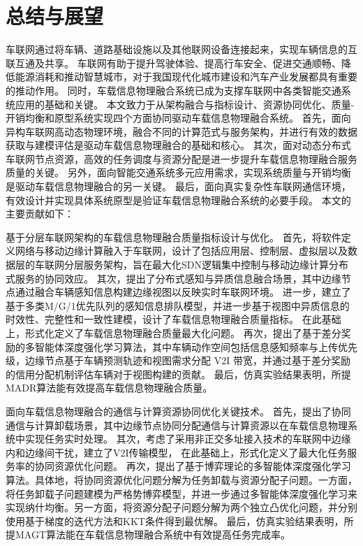 \chapter{总结与展望}\label{section 6}

车联网通过将车辆、道路基础设施以及其他联网设备连接起来，实现车辆信息的互联互通及共享。
车联网有助于提升驾驶体验、提高行车安全、促进交通顺畅、降低能源消耗和推动智慧城市，对于我国现代化城市建设和汽车产业发展都具有重要的推动作用。
同时，车载信息物理融合系统已成为支撑车联网中各类智能交通系统应用的基础和关键。
本文致力于从架构融合与指标设计、资源协同优化、质量-开销均衡和原型系统实现四个方面协同驱动车载信息物理融合系统。
首先，面向异构车联网高动态物理环境，融合不同的计算范式与服务架构，并进行有效的数据获取与建模评估是驱动车载信息物理融合的基础和核心。
其次，面对动态分布式车联网节点资源，高效的任务调度与资源分配是进一步提升车载信息物理融合服务质量的关键。
另外，面向智能交通系统多元应用需求，实现系统质量与开销均衡是驱动车载信息物理融合的另一关键。
最后，面向真实复杂性车联网通信环境，有效设计并实现具体系统原型是验证车载信息物理融合系统的必要手段。
本文的主要贡献如下：

 基于分层车联网架构的车载信息物理融合质量指标设计与优化。
首先，将软件定义网络与移动边缘计算融入于车联网，设计了包括应用层、控制层、虚拟层以及数据层的车联网分层服务架构，旨在最大化SDN逻辑集中控制与移动边缘计算分布式服务的协同效应。
其次，提出了分布式感知与异质信息融合场景，其中边缘节点通过融合车辆感知信息构建边缘视图以反映实时车联网环境。
进一步，建立了基于多类M/G/1优先队列的感知信息排队模型，并进一步基于视图中异质信息的时效性、完整性和一致性建模，设计了车载信息物理融合质量指标。
在此基础上，形式化定义了车载信息物理融合质量最大化问题。
再次，提出了基于差分奖励的多智能体深度强化学习算法，其中车辆动作空间包括信息感知频率与上传优先级，边缘节点基于车辆预测轨迹和视图需求分配 V2I 带宽，并通过基于差分奖励的信用分配机制评估车辆对于视图构建的贡献。
最后，仿真实验结果表明，所提MADR算法能有效提高车载信息物理融合质量。

 面向车载信息物理融合的通信与计算资源协同优化关键技术。
首先，提出了协同通信与计算卸载场景，其中边缘节点协同分配通信与计算资源以在车载信息物理系统中实现任务实时处理。
其次，考虑了采用非正交多址接入技术的车联网中边缘内和边缘间干扰，建立了V2I传输模型，
在此基础上，形式化定义了最大化任务服务率的协同资源优化问题。
再次，提出了基于博弈理论的多智能体深度强化学习算法。具体地，将协同资源优化问题分解为任务卸载与资源分配子问题。一方面，将任务卸载子问题建模为严格势博弈模型，并进一步通过多智能体深度强化学习来实现纳什均衡。另一方面，将资源分配子问题分解为两个独立凸优化问题，并分别使用基于梯度的迭代方法和KKT条件得到最优解。
最后，仿真实验结果表明，所提MAGT算法能在车载信息物理融合系统中有效提高任务完成率。

